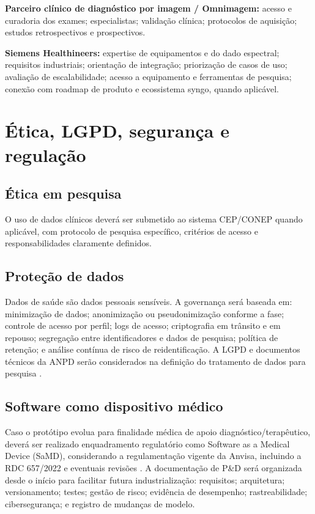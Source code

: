 \documentclass[11pt,a4paper]{article}
\begin{document}
\textbf{Parceiro clínico de diagnóstico por imagem / Omnimagem:} acesso e curadoria dos exames; especialistas; validação clínica; protocolos de aquisição; estudos retrospectivos e prospectivos.

\textbf{Siemens Healthineers:} expertise de equipamentos e do dado espectral; requisitos industriais; orientação de integração; priorização de casos de uso; avaliação de escalabilidade; acesso a equipamento e ferramentas de pesquisa; conexão com roadmap de produto e ecossistema syngo, quando aplicável.

\section{Ética, LGPD, segurança e regulação}

\subsection{Ética em pesquisa}

O uso de dados clínicos deverá ser submetido ao sistema CEP/CONEP quando aplicável, com protocolo de pesquisa específico, critérios de acesso e responsabilidades claramente definidos.

\subsection{Proteção de dados}

Dados de saúde são dados pessoais sensíveis. A governança será baseada em: minimização de dados; anonimização ou pseudonimização conforme a fase; controle de acesso por perfil; logs de acesso; criptografia em trânsito e em repouso; segregação entre identificadores e dados de pesquisa; política de retenção; e análise contínua de risco de reidentificação. A LGPD e documentos técnicos da ANPD serão considerados na definição do tratamento de dados para pesquisa \cite{lgpd,anpd}.

\subsection{Software como dispositivo médico}

Caso o protótipo evolua para finalidade médica de apoio diagnóstico/terapêutico, deverá ser realizado enquadramento regulatório como Software as a Medical Device (SaMD), considerando a regulamentação vigente da Anvisa, incluindo a RDC 657/2022 e eventuais revisões \cite{anvisa}. A documentação de P\&D será organizada desde o início para facilitar futura industrialização: requisitos; arquitetura; versionamento; testes; gestão de risco; evidência de desempenho; rastreabilidade; cibersegurança; e registro de mudanças de modelo.
\end{document}
